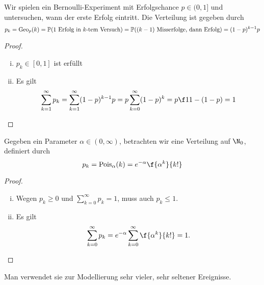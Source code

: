 
\begin{ex} \label{1.2.5}
	Wir spielen ein Bernoulli-Experiment mit Erfolgschance $p\in (0,1]$ und untersuchen, wann der erste Erfolg eintritt.
	Die Verteilung ist gegeben durch
	\[
		p_k
		= \operatorname{Geo}_p(k)
		= \mathbb{P}(\text{1 Erfolg in $k$-tem Versuch})
		= \mathbb{P}(\text{$(k-1)$ Misserfolge, dann Erfolg)}
		= (1-p)^{k-1} p
	\]
	\begin{proof}
		\begin{enumerate}[(i)]
			\item
				$p_k \in [0,1]$ ist erfüllt
			\item
				Es gilt
				\[
					\sum_{k=1}^\infty p_k
					= \sum_{k=1}^\infty (1-p)^{k-1} p
					= p \sum_{k=0}^\infty (1-p)^k
					= p \f 1{1-(1-p)}
					= 1
				\]
		\end{enumerate}
	\end{proof}
\end{ex}

\begin{ex} \label{1.2.6}
	Gegeben ein Parameter $\alpha \in (0,\infty)$, betrachten wir eine Verteilung auf $\N_0$, definiert durch
	\[
		p_k
		= \Pois_\alpha(k)
		= e^{-\alpha} \f {\alpha^k}{k!}
	\]
	\begin{proof}
		\begin{enumerate}[(i)]
			\item
				Wegen $p_k \ge 0$ und $\sum_{k=0}^\infty p_k = 1$, muss auch $p_k \le 1$.
			\item
				Es gilt
				\[
					\sum_{k=0}^\infty p_k = e^{-\alpha} \sum_{k=0}^\infty \f {\alpha^k}{k!} = 1.
				\]
		\end{enumerate}
	\end{proof}
	Man verwendet sie zur Modellierung sehr vieler, sehr seltener Ereignisse.
\end{ex}

